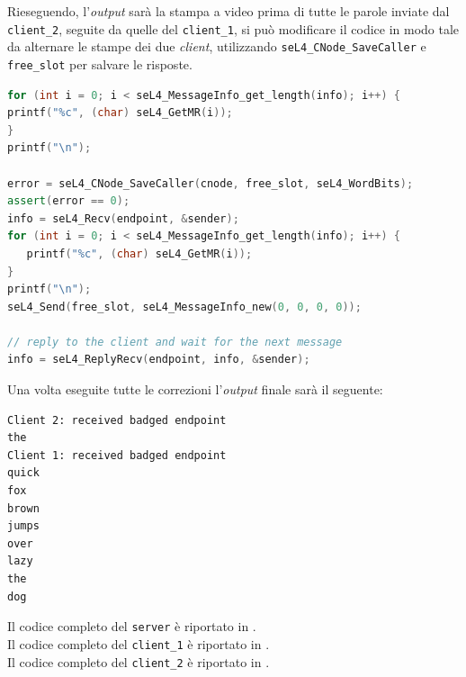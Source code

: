 Rieseguendo, l'\textit{output} sarà la stampa a video prima di tutte le parole inviate dal \texttt{client\_2}, seguite da quelle del \texttt{client\_1}, si può modificare il codice in modo tale da alternare le stampe dei due \textit{client}, utilizzando \texttt{seL4\_CNode\_SaveCaller} e \texttt{free\_slot} per salvare le risposte.
\begin{lstlisting}[language=C++]
for (int i = 0; i < seL4_MessageInfo_get_length(info); i++) {
printf("%c", (char) seL4_GetMR(i));
}
printf("\n");

error = seL4_CNode_SaveCaller(cnode, free_slot, seL4_WordBits);
assert(error == 0);
info = seL4_Recv(endpoint, &sender);
for (int i = 0; i < seL4_MessageInfo_get_length(info); i++) {
   printf("%c", (char) seL4_GetMR(i));
}
printf("\n");
seL4_Send(free_slot, seL4_MessageInfo_new(0, 0, 0, 0));

// reply to the client and wait for the next message
info = seL4_ReplyRecv(endpoint, info, &sender);
\end{lstlisting}

Una volta eseguite tutte le correzioni l'\textit{output} finale sarà il seguente:
\begin{lstlisting}[language=bash]
Client 2: received badged endpoint
the
Client 1: received badged endpoint
quick
fox
brown
jumps
over
lazy
the
dog
\end{lstlisting}
Il codice completo del \texttt{server} è riportato in \cite{IPCserver}.\\
Il codice completo del \texttt{client\_1} è riportato in \cite{IPCclient1}.\\
Il codice completo del \texttt{client\_2} è riportato in \cite{IPCclient2}.